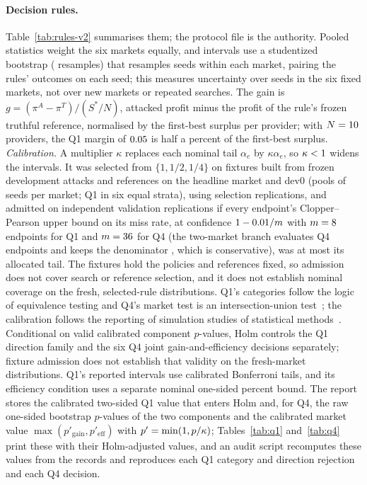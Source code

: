 \documentclass[11pt]{article}
\begin{document}
\paragraph{Decision rules.} Table~\ref{tab:rules-v2} summarises them; the protocol file is the authority. Pooled statistics weight the six markets equally, and intervals use a studentized bootstrap ( resamples) that resamples seeds within each market, pairing the rules' outcomes on each seed; this measures uncertainty over seeds in the six fixed markets, not over new markets or repeated searches. The gain is $g = (\pi^{A} - \pi^{T})/(S^*/N)$, attacked profit minus the profit of the rule's frozen truthful reference, normalised by the first-best surplus per provider; with $N = 10$ providers, the Q1 margin of $0.05$ is half a percent of the first-best surplus. \emph{Calibration.} A multiplier $\kappa$ replaces each nominal tail $\alpha_e$ by $\kappa\alpha_e$, so $\kappa < 1$ widens the intervals. It was selected from $\{1, 1/2, 1/4\}$ on fixtures built from frozen development attacks and references on the headline market and dev0 (pools of  seeds per market; Q1 in six equal strata), using  selection replications, and admitted on  independent validation replications if every endpoint's Clopper--Pearson upper bound on its miss rate, at confidence $1 - 0.01/m$ with $m = 8$ endpoints for Q1 and $m = 36$ for Q4 (the two-market branch evaluates  Q4 endpoints and keeps the denominator , which is conservative), was at most its allocated tail. The fixtures hold the policies and references fixed, so admission does not cover search or reference selection, and it does not establish nominal coverage on the fresh, selected-rule distributions. Q1's categories follow the logic of equivalence testing and Q4's market test is an intersection-union test~\cite{berger1996bioequivalence}; the calibration follows the reporting of simulation studies of statistical methods~\cite{morris2019simulation}. Conditional on valid calibrated component $p$-values, Holm controls the Q1 direction family and the six Q4 joint gain-and-efficiency decisions separately; fixture admission does not establish that validity on the fresh-market distributions. Q1's reported intervals use calibrated Bonferroni tails, and its efficiency condition uses a separate nominal one-sided  percent bound. The report stores the calibrated two-sided Q1 value that enters Holm and, for Q4, the raw one-sided bootstrap $p$-values of the two components and the calibrated market value $\max(p'_{\mathrm{gain}}, p'_{\mathrm{eff}})$ with $p' = \min(1, p/\kappa)$; Tables~\ref{tab:q1} and~\ref{tab:q4} print these with their Holm-adjusted values, and an audit script recomputes these values from the records and reproduces each Q1 category and direction rejection and each Q4 decision.
\end{document}
